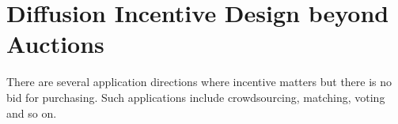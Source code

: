 \documentclass{article}
\begin{document}

\section{Diffusion Incentive Design beyond Auctions}
There are several application directions where incentive matters but there is no bid for purchasing. Such applications include crowdsourcing, matching, voting and so on. 

\end{document}
